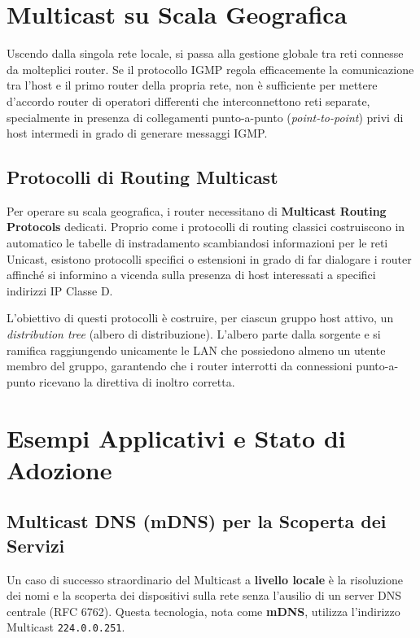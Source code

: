 \section{Multicast su Scala Geografica}

Uscendo dalla singola rete locale, si passa alla gestione globale tra reti connesse da molteplici router. 
Se il protocollo IGMP regola efficacemente la comunicazione tra l'host e il primo router della propria rete, non è sufficiente per mettere d'accordo router di operatori differenti che interconnettono reti separate, specialmente in presenza di collegamenti punto-a-punto (\textit{point-to-point}) privi di host intermedi in grado di generare messaggi IGMP.

\subsection{Protocolli di Routing Multicast}
Per operare su scala geografica, i router necessitano di \textbf{Multicast Routing Protocols} dedicati. 
Proprio come i protocolli di routing classici costruiscono in automatico le tabelle di instradamento scambiandosi informazioni per le reti Unicast, esistono protocolli specifici o estensioni in grado di far dialogare i router affinché si informino a vicenda sulla presenza di host interessati a specifici indirizzi IP Classe D.

L'obiettivo di questi protocolli è costruire, per ciascun gruppo host attivo, un \textit{distribution tree} (albero di distribuzione). L'albero parte dalla sorgente e si ramifica raggiungendo unicamente le LAN che possiedono almeno un utente membro del gruppo, garantendo che i router interrotti da connessioni punto-a-punto ricevano la direttiva di inoltro corretta.

\section{Esempi Applicativi e Stato di Adozione}

\subsection{Multicast DNS (mDNS) per la Scoperta dei Servizi}
Un caso di successo straordinario del Multicast a \textbf{livello locale} è la risoluzione dei nomi e la scoperta dei dispositivi sulla rete senza l'ausilio di un server DNS centrale (RFC 6762). 
Questa tecnologia, nota come \textbf{mDNS}, utilizza l'indirizzo Multicast \texttt{224.0.0.251}.

